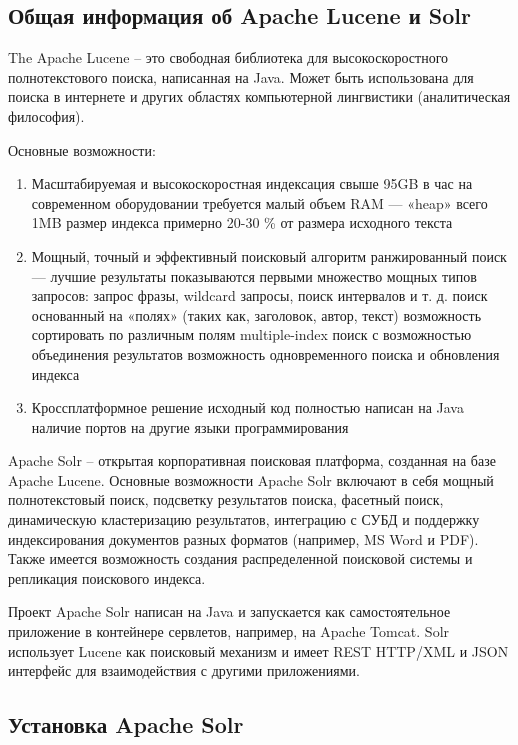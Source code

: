 \subsection{Общая информация об Apache Lucene и Solr}

The Apache Lucene -- это свободная библиотека для высокоскоростного полнотекстового поиска, написанная на Java. Может быть использована для поиска в интернете и других областях компьютерной лингвистики (аналитическая философия).

Основные возможности:

\begin{enumerate}
 \item Масштабируемая и высокоскоростная индексация
  \subitem свыше 95GB в час на современном оборудовании 
  \subitem требуется малый объем RAM — «heap» всего 1MB 
  \subitem размер индекса примерно 20-30 \% от размера исходного текста
 \item Мощный, точный и эффективный поисковый алгоритм
  \subitem ранжированный поиск — лучшие результаты показываются первыми
  \subitem множество мощных типов запросов: запрос фразы, wildcard запросы, поиск интервалов и т. д.
  \subitem поиск основанный на «полях» (таких как, заголовок, автор, текст)
  \subitem возможность сортировать по различным полям
  \subitem multiple-index поиск с возможностью объединения результатов
  \subitem возможность одновременного поиска и обновления индекса
 \item Кроссплатформное решение
  \subitem исходный код полностью написан на Java
  \subitem наличие портов на другие языки программирования
\end{enumerate}

Apache Solr – открытая корпоративная поисковая платформа, созданная на базе Apache Lucene. Основные возможности Apache Solr включают в себя мощный полнотекстовый поиск, подсветку результатов поиска, фасетный поиск, динамическую кластеризацию результатов, интеграцию с СУБД и поддержку индексирования документов разных форматов (например, MS Word и PDF). Также имеется возможность создания распределенной поисковой системы и репликация поискового индекса. 

Проект Apache Solr написан на Java  и запускается как самостоятельное приложение в контейнере сервлетов, например, на Apache Tomcat. Solr использует Lucene как поисковый механизм и имеет REST HTTP/XML и JSON интерфейс для взаимодействия с другими приложениями. 

\subsection{Установка Apache Solr}

